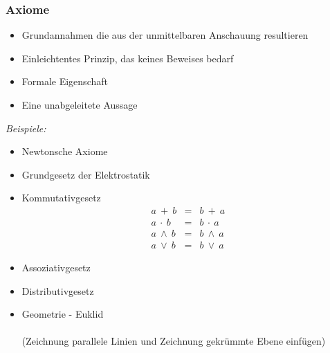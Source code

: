         \subsubsection{Axiome}
            \begin{itemize}[leftmargin=*]
                \item Grundannahmen die aus der unmittelbaren Anschauung resultieren
                \item Einleichtentes Prinzip, das keines Beweises bedarf
                \item Formale Eigenschaft
                \item Eine unabgeleitete Aussage
            \end{itemize}
            \textit{Beispiele:}
            \begin{itemize}[leftmargin=*]
                \item Newtonsche Axiome
                \item Grundgesetz der Elektrostatik
                \item Kommutativgesetz \\
                    \vspace{-0.8cm}
                    \begin{eqnarray*}
                        a \ +     \ b &=& b \ +     \ a \\
                        a \ \cdot \ b &=& b \ \cdot \ a \\
                        a \ \land \ b &=& b \ \land \ a \\
                        a \ \lor  \ b &=& b \ \lor  \ a
                    \end{eqnarray*}
                \item Assoziativgesetz  
                \item Distributivgesetz 
                \item Geometrie - Euklid \\
                    \\ (Zeichnung parallele Linien und Zeichnung gekrümmte Ebene einfügen)
            \end{itemize}
